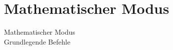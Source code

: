 \documentclass{beamer}
\begin{document}
 \section{Mathematischer Modus}
 \begin{frame}
  \begin{center}
   \Huge Mathematischer Modus \\
   \Large Grundlegende Befehle
  \end{center}
 \end{frame}
%  
%  
\end{document}
